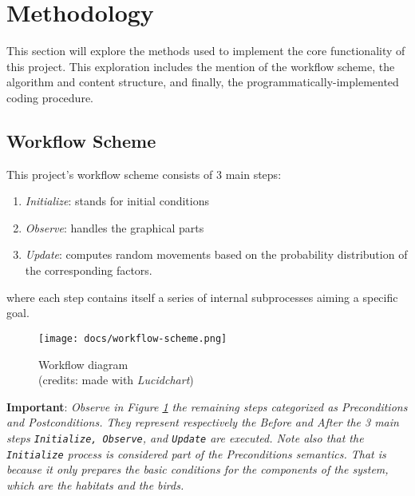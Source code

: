 \section{Methodology}
This section will explore the methods used to implement the core functionality of this project. This exploration includes the mention of the workflow scheme, the algorithm and content structure, and finally, the programmatically-implemented coding procedure.

\subsection{Workflow Scheme}
This project's workflow scheme consists of 3 main steps:
\begin{enumerate}
    \item \textit{Initialize}: stands for initial conditions
    \item \textit{Observe}: handles the graphical parts
    \item \textit{Update}: computes random movements based on the probability distribution of the corresponding factors.
\end{enumerate}
where each step contains itself a series of internal subprocesses aiming a specific goal.

\begin{figure}[h!]
    \centering
    \texttt{[image: docs/workflow-scheme.png]}
    \caption{Workflow diagram \\ (credits: made with \emph{Lucidchart})}
    \label{fig:workflow-scheme}
\end{figure}

\noindent
\textbf{Important}: \textit{Observe in Figure \ref{fig:workflow-scheme} the remaining steps categorized as \emph{Preconditions} and \emph{Postconditions}. They represent respectively the \emph{Before} and \emph{After} the 3 main steps \texttt{Initialize, Observe}, and \texttt{Update} are executed. Note also that the \texttt{Initialize} process is considered part of the Preconditions semantics. That is because it only prepares the basic conditions for the components of the system, which are the habitats and the birds.}

